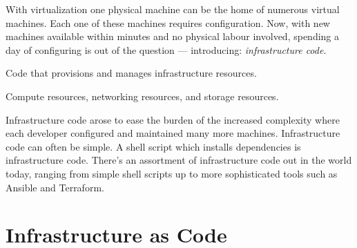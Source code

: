 With virtualization one physical machine can be the home of numerous virtual machines.
Each one of these machines requires configuration.
Now, with new machines available within minutes and no physical labour involved,
spending a day of configuring is out of the question
--- introducing: \textsl{infrastructure code}.

\begin{definition}
Code that provisions and manages infrastructure resources.
\end{definition}

\begin{definition}
Compute resources, networking resources, and storage resources.
\end{definition}

Infrastructure code arose to ease the burden of the increased complexity where each developer configured and maintained many more machines.
Infrastructure code can often be simple.
A shell script which installs dependencies is infrastructure code.
There's an assortment of infrastructure code out in the world today, ranging from simple shell scripts up to more sophisticated tools such as Ansible and Terraform.

\begin{figure}[ht]
    \centering
\end{figure}


\section{Infrastructure as Code}

